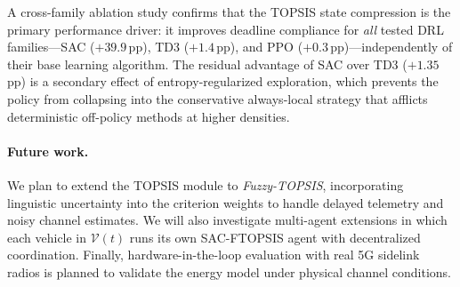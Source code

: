 \documentclass[iicol]{sn-jnl}
\begin{document}
A cross-family ablation study confirms that the TOPSIS state compression is the
primary performance driver: it improves deadline compliance for \emph{all}
tested DRL families—SAC ($+39.9$\,pp), TD3 ($+1.4$\,pp), and PPO
($+0.3$\,pp)—independently of their base learning algorithm.
The residual advantage of SAC over TD3 ($+1.35$\,pp) is a secondary effect
of entropy-regularized exploration, which prevents the policy from collapsing
into the conservative always-local strategy that afflicts deterministic
off-policy methods at higher densities.

\paragraph{Future work.}
We plan to extend the TOPSIS module to \emph{Fuzzy-TOPSIS}, incorporating
linguistic uncertainty into the criterion weights to handle delayed telemetry
and noisy channel estimates.
We will also investigate multi-agent extensions in which each vehicle in
$\mathcal{V}(t)$ runs its own SAC-FTOPSIS agent with decentralized coordination.
Finally, hardware-in-the-loop evaluation with real 5G sidelink radios is
planned to validate the energy model under physical channel conditions.



\end{document}
